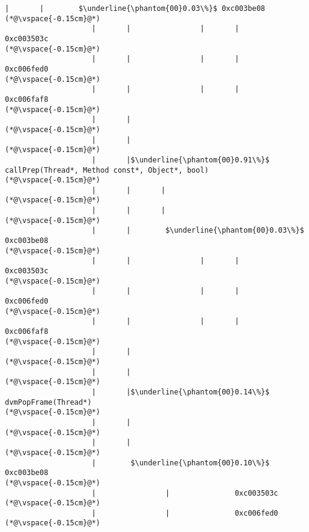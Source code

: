 \begin{lstlisting}[caption=Metodikutsu C$\to$Java 20 viiteparametrilla, label=profile:C2JBenchmark00206, numberbychapter=true, frame=lines, float, floatplacement=t]
                    |       |        $\underline{\phantom{00}0.03\%}$ 0xc003be08
(*@\vspace{-0.15cm}@*)
                    |       |                |       |               0xc003503c
(*@\vspace{-0.15cm}@*)
                    |       |                |       |               0xc006fed0
(*@\vspace{-0.15cm}@*)
                    |       |                |       |               0xc006faf8
(*@\vspace{-0.15cm}@*)
                    |       |
(*@\vspace{-0.15cm}@*)
                    |       |
(*@\vspace{-0.15cm}@*)
                    |       |$\underline{\phantom{00}0.91\%}$ callPrep(Thread*, Method const*, Object*, bool)
(*@\vspace{-0.15cm}@*)
                    |       |       |
(*@\vspace{-0.15cm}@*)
                    |       |       |
(*@\vspace{-0.15cm}@*)
                    |       |        $\underline{\phantom{00}0.03\%}$ 0xc003be08
(*@\vspace{-0.15cm}@*)
                    |       |                |       |               0xc003503c
(*@\vspace{-0.15cm}@*)
                    |       |                |       |               0xc006fed0
(*@\vspace{-0.15cm}@*)
                    |       |                |       |               0xc006faf8
(*@\vspace{-0.15cm}@*)
                    |       |
(*@\vspace{-0.15cm}@*)
                    |       |
(*@\vspace{-0.15cm}@*)
                    |       |$\underline{\phantom{00}0.14\%}$ dvmPopFrame(Thread*)
(*@\vspace{-0.15cm}@*)
                    |       |
(*@\vspace{-0.15cm}@*)
                    |       |
(*@\vspace{-0.15cm}@*)
                    |        $\underline{\phantom{00}0.10\%}$ 0xc003be08
(*@\vspace{-0.15cm}@*)
                    |                |               0xc003503c
(*@\vspace{-0.15cm}@*)
                    |                |               0xc006fed0
(*@\vspace{-0.15cm}@*)

\end{lstlisting}
